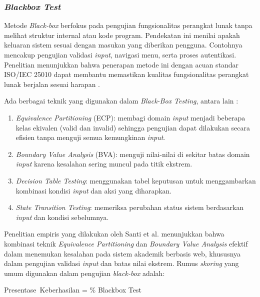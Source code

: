 \subsubsection{\textit{Blackbox Test}} \label{II.BlackboxTest}
Metode \textit{Black-box} berfokus pada pengujian fungsionalitas perangkat lunak tanpa melihat struktur internal atau kode program. Pendekatan ini menilai apakah keluaran sistem sesuai dengan masukan yang diberikan pengguna. Contohnya mencakup pengujian validasi \textit{input}, navigasi menu, serta proses autentikasi. Penelitian menunjukkan bahwa penerapan metode ini dengan acuan standar ISO/IEC 25010 dapat membantu memastikan kualitas fungsionalitas perangkat lunak berjalan sesuai harapan \cite{buana2022pengujian}.\par

Ada berbagai teknik yang digunakan dalam \textit{Black-Box Testing}, antara lain \cite{santi2022blackbox}:\par
\begin{enumerate}[noitemsep]
	\item \textit{Equivalence Partitioning} (ECP): membagi domain \textit{input} menjadi beberapa kelas ekivalen (valid dan invalid) sehingga pengujian dapat dilakukan secara efisien tanpa menguji semua kemungkinan \textit{input}.
	\item \textit{Boundary Value Analysis} (BVA): menguji nilai-nilai di sekitar batas domain \textit{input} karena kesalahan sering muncul pada titik ekstrem.
	\item \textit{Decision Table Testing}: menggunakan tabel keputusan untuk menggambarkan kombinasi kondisi \textit{input} dan aksi yang diharapkan.
	\item \textit{State Transition Testing}: memeriksa perubahan status sistem berdasarkan \textit{input} dan kondisi sebelumnya.
\end{enumerate}

Penelitian empiris yang dilakukan oleh Santi et al. \cite{santi2022blackbox} menunjukkan bahwa kombinasi teknik \textit{Equivalence Partitioning} dan \textit{Boundary Value Analysis} efektif dalam menemukan kesalahan pada sistem akademik berbasis web, khususnya dalam pengujian validasi \textit{input} dan batas nilai ekstrem. Rumus \textit{skoring} yang umum digunakan dalam pengujian \textit{black-box} adalah:\par

\begin{equationcaptioned}[eq:2.blackbox]{
	Presentase\ Keberhasilan =  \%
}{
	Blackbox Test
}
\end{equationcaptioned}

